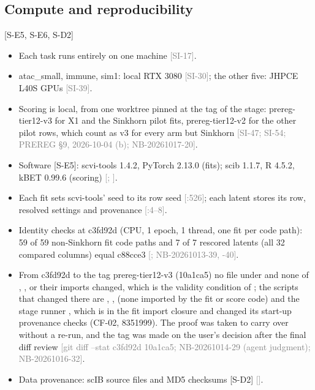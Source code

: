 \documentclass[11pt]{article}
\newcommand{\src}[1]{{\scriptsize\textcolor{gray}{[#1]}}}
\begin{document}
\subsection{Compute and reproducibility}
[S-E5, S-E6, S-D2]
\begin{itemize}
\item Each task runs entirely on one machine \src{SI-17}.
\item atac\_small, immune, sim1: local RTX 3080 \src{SI-30}; the other five: JHPCE L40S GPUs \src{SI-39}.
\item Scoring is local, from one worktree pinned at the tag of the stage: prereg-tier12-v3 for X1 and the Sinkhorn pilot fits, prereg-tier12-v2 for the other pilot rows, which count as v3 for every arm but Sinkhorn \src{SI-47; SI-54; PREREG \S9, 2026-10-04 (b); NB-20261017-20}.
\item Software [S-E5]: scvi-tools 1.4.2, PyTorch 2.13.0 (fits); scib 1.1.7, R 4.5.2, kBET 0.99.6 (scoring) \src{; \file{docs/jhpce/gate_data/versions_*_local.json}}.
\item Each fit sets scvi-tools' seed to its row seed \src{:526}; each latent stores its row, resolved settings and provenance \src{:4--8}.
\item Identity checks at c3fd92d (CPU, 1 epoch, 1 thread, one fit per code path): 59 of 59 non-Sinkhorn fit code paths and 7 of 7 rescored latents (all 32 compared columns) equal c88cce3 \src{; NB-20261013-39, -40}.
\item From c3fd92d to the tag prereg-tier12-v3 (10a1ca5) no file under  and none of , ,  or their imports changed, which is the validity condition of ; the scripts that changed there are , ,  (none imported by the fit or score code) and the stage runner , which is in the fit import closure and changed its start-up provenance checks (CF-02, 8351999). The proof was taken to carry over without a re-run, and the tag was made on the user's decision after the final diff review \src{git diff --stat c3fd92d 10a1ca5; NB-20261014-29 (agent judgment); NB-20261016-32}.
\item Data provenance: scIB source files and MD5 checksums [S-D2] \src{}.
\end{itemize}
\end{document}

